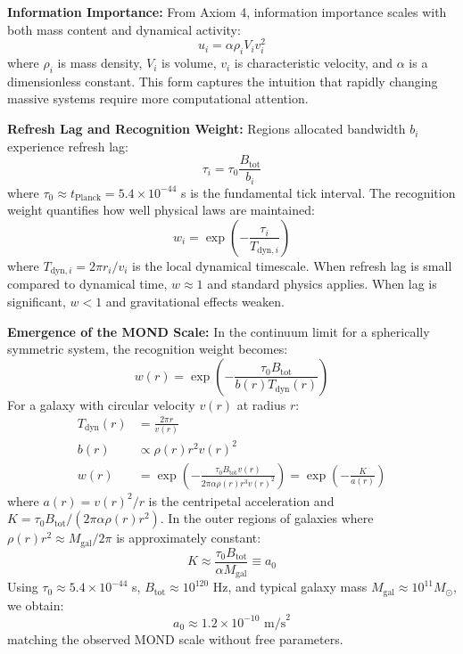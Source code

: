 \documentclass[12pt,letterpaper]{article}
\begin{document}
\textbf{Information Importance:} From Axiom 4, information importance scales with both mass content and dynamical activity:
\begin{equation}
u_i = \alpha \rho_i V_i v_i^2
\end{equation}
where $\rho_i$ is mass density, $V_i$ is volume, $v_i$ is characteristic velocity, and $\alpha$ is a dimensionless constant. This form captures the intuition that rapidly changing massive systems require more computational attention.

\textbf{Refresh Lag and Recognition Weight:} Regions allocated bandwidth $b_i$ experience refresh lag:
\begin{equation}
\tau_i = \tau_0 \frac{B_{\text{tot}}}{b_i}
\end{equation}
where $\tau_0 \approx t_{\text{Planck}} = 5.4 \times 10^{-44}$ s is the fundamental tick interval. The recognition weight quantifies how well physical laws are maintained:
\begin{equation}
w_i = \exp\left(-\frac{\tau_i}{T_{\text{dyn},i}}\right)
\end{equation}
where $T_{\text{dyn},i} = 2\pi r_i/v_i$ is the local dynamical timescale. When refresh lag is small compared to dynamical time, $w \approx 1$ and standard physics applies. When lag is significant, $w < 1$ and gravitational effects weaken.

\textbf{Emergence of the MOND Scale:} In the continuum limit for a spherically symmetric system, the recognition weight becomes:
\begin{equation}
w(r) = \exp\left(-\frac{\tau_0 B_{\text{tot}}}{b(r) T_{\text{dyn}}(r)}\right)
\end{equation}
For a galaxy with circular velocity $v(r)$ at radius $r$:
\begin{align}
T_{\text{dyn}}(r) &= \frac{2\pi r}{v(r)} \\
b(r) &\propto \rho(r) r^2 v(r)^2 \\
w(r) &= \exp\left(-\frac{\tau_0 B_{\text{tot}} v(r)}{2\pi \alpha \rho(r) r^3 v(r)^2}\right) = \exp\left(-\frac{K}{a(r)}\right)
\end{align}
where $a(r) = v(r)^2/r$ is the centripetal acceleration and $K = \tau_0 B_{\text{tot}}/(2\pi \alpha \rho(r) r^2)$. In the outer regions of galaxies where $\rho(r) r^2 \approx M_{\text{gal}}/2\pi$ is approximately constant:
\begin{equation}
K \approx \frac{\tau_0 B_{\text{tot}}}{\alpha M_{\text{gal}}} \equiv a_0
\end{equation}
Using $\tau_0 \approx 5.4 \times 10^{-44}$ s, $B_{\text{tot}} \approx 10^{120}$ Hz, and typical galaxy mass $M_{\text{gal}} \approx 10^{11} M_\odot$, we obtain:
\begin{equation}
a_0 \approx 1.2 \times 10^{-10} \text{ m/s}^2
\end{equation}
matching the observed MOND scale without free parameters.
\end{document}
